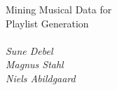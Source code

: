 {\noindent \LARGE Mining Musical Data for\\Playlist Generation}
\vspace{1cm}
\\\\
\textit{\noindent Sune Debel \\ \noindent Magnus Stahl \\ \noindent Niels Abildgaard}
\newpage
